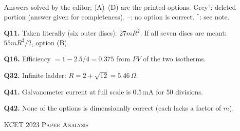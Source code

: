 {\footnotesize Answers solved by the editor; (A)--(D) are the printed options. {\color{gray}Grey$^{\dagger}$}: deleted portion (answer given for completeness). --: no option is correct. $^{*}$: see note.\par
\par\smallskip\textbf{Q11.} Taken literally (six outer discs): $27mR^2$. If all seven discs are meant: $55mR^2/2$, option (B).
\par\smallskip\textbf{Q16.} Efficiency $= 1 - 2.5/4 = 0.375$ from $PV$ of the two isotherms.
\par\smallskip\textbf{Q32.} Infinite ladder: $R = 2 + \sqrt{12} = 5.46\,\Omega$.
\par\smallskip\textbf{Q41.} Galvanometer current at full scale is 0.5\,mA for 50 divisions.
\par\smallskip\textbf{Q42.} None of the options is dimensionally correct (each lacks a factor of $m$).
}\par
\clearpage
\begin{center}{}\par
{\fontsize{20}{24}\selectfont\color{navy}\scshape KCET 2023 \textperiodcentered{} Paper Analysis}\par
{\color{gilt}}\end{center}
\vspace{4pt}
